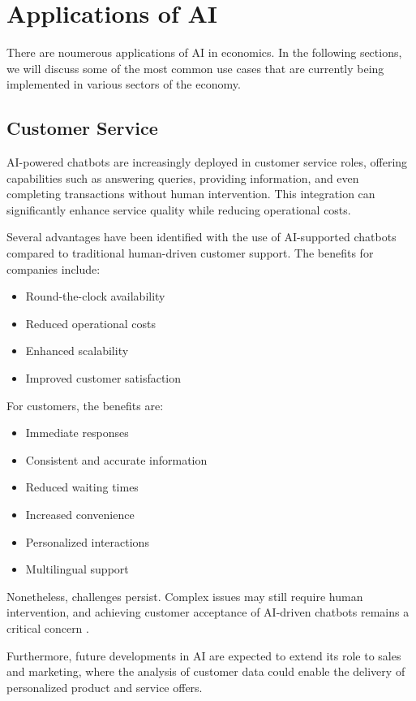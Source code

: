 \section{Applications of AI }
\label{sec:applications-of-ai}

There are noumerous applications of AI in economics. In the following sections, we will discuss some of the most common use cases that are 
currently being implemented in various sectors of the economy.

\subsection{Customer Service}

AI-powered chatbots are increasingly deployed in customer service roles, offering capabilities such as answering queries, providing information, and even completing transactions without human intervention. This integration can significantly enhance service quality while reducing operational costs.

Several advantages have been identified with the use of AI-supported chatbots compared to traditional human-driven customer support. The benefits for companies include:
\begin{itemize}
    \item Round-the-clock availability
    \item Reduced operational costs
    \item Enhanced scalability
    \item Improved customer satisfaction
\end{itemize}

For customers, the benefits are:
\begin{itemize}
    \item Immediate responses
    \item Consistent and accurate information
    \item Reduced waiting times
    \item Increased convenience
    \item Personalized interactions
    \item Multilingual support
\end{itemize}

Nonetheless, challenges persist. Complex issues may still require human intervention, and achieving customer acceptance of AI-driven chatbots remains a critical concern \cite{Customer-Service-AI-Chatbots}. 

Furthermore, future developments in AI are expected to extend its role to sales and marketing, where the analysis of customer data could enable the delivery of personalized product and service offers.

